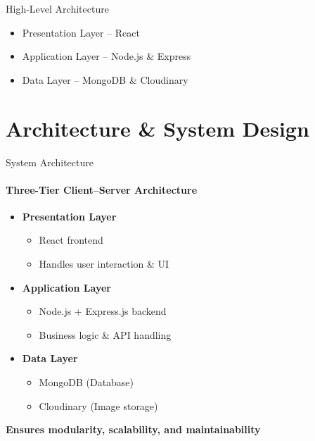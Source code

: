 \documentclass[aspectratio=169]{beamer}
\begin{document}
\begin{frame}{High-Level Architecture}
\begin{itemize}
    \item Presentation Layer – React
    \item Application Layer – Node.js \& Express
    \item Data Layer – MongoDB \& Cloudinary
\end{itemize}
\end{frame}


\section{Architecture \& System Design}

\begin{frame}{System Architecture}
\framesubtitle{Three-Tier Client–Server Architecture}
\begin{itemize}
    \item \textbf{Presentation Layer}
    \begin{itemize}
        \item React frontend
        \item Handles user interaction \& UI
    \end{itemize}
    \vspace{0.3cm}
    \item \textbf{Application Layer}
    \begin{itemize}
        \item Node.js + Express.js backend
        \item Business logic \& API handling
    \end{itemize}
    \vspace{0.3cm}
    \item \textbf{Data Layer}
    \begin{itemize}
        \item MongoDB (Database)
        \item Cloudinary (Image storage)
    \end{itemize}
\end{itemize}
\vspace{0.3cm}
\textcolor{cambridgeblue}{\textbf{Ensures modularity, scalability, and maintainability}}
\end{frame}
\end{document}
